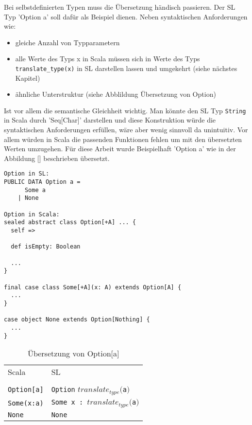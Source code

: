 \documentclass[12pt,a4paper]{report}
\begin{document}
Bei selbstdefinierten Typen muss die Übersetzung händisch passieren. Der \ac{SL} Typ 'Option a' soll dafür als Beispiel dienen. Neben syntaktischen Anforderungen wie:
\begin{itemize}
  \item gleiche Anzahl von Typparametern
  \item alle Werte des Typs x in Scala müssen sich in Werte des Typs \lstinline!translate_type(x)! in \ac{SL} darstellen lassen und umgekehrt (siehe nächstes Kapitel)
  \item ähnliche Unterstruktur (siehe Abblildung Übersetzung von Option)
\end{itemize}
Ist vor allem die semantische Gleichheit wichtig. Man könnte den \ac{SL} Typ \lstinline!String! in Scala durch 'Seq[Char]' darstellen und diese Konstruktion würde die syntaktischen Anforderungen erfüllen, wäre aber wenig sinnvoll da unintuitiv. Vor allem würden in Scala die passenden Funktionen fehlen um mit den übersetzten Werten umzugehen.
Für diese Arbeit wurde Beispielhaft 'Option a' wie in der Abbildung [] beschrieben übersetzt.

\begin{lstlisting}[caption=Option in \ac{SL} und Scala, label=lst:bsp2]
Option in SL:
PUBLIC DATA Option a =
	  Some a
	| None

Option in Scala:
sealed abstract class Option[+A] ... {
  self =>

  def isEmpty: Boolean
  
  ...
}

final case class Some[+A](x: A) extends Option[A] {
  ...
}

case object None extends Option[Nothing] {
  ...
}
\end{lstlisting}


\begin{table}
\caption{Übersetzung von Option[a]}
\centering
\begin{tabular}{ll}
Scala                 & \ac{SL} \\\\

\lstinline!Option[a]! & \lstinline!Option! $translate_{type}($\lstinline!a!$)$ \\
\lstinline!Some(x:a)! & \lstinline!Some x : !$translate_{type}($\lstinline!a!$)$ \\
\lstinline!None!      & \lstinline!None! \\
\end{tabular}
\end{table}
\end{document}
